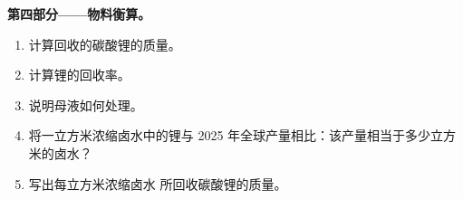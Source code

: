 \begin{problem}
\medskip
\noindent\textbf{第四部分——物料衡算。}
\begin{enumerate}[resume]
  \item 计算回收的碳酸锂的质量。
  \item 计算锂的回收率。
  \item 说明母液如何处理。
  \item 将一立方米浓缩卤水中的锂与
        2025 年全球产量相比：该产量相当于多少立方米的卤水？
  \item 写出每立方米浓缩卤水
        所回收碳酸锂的质量。
\end{enumerate}
\end{problem}
